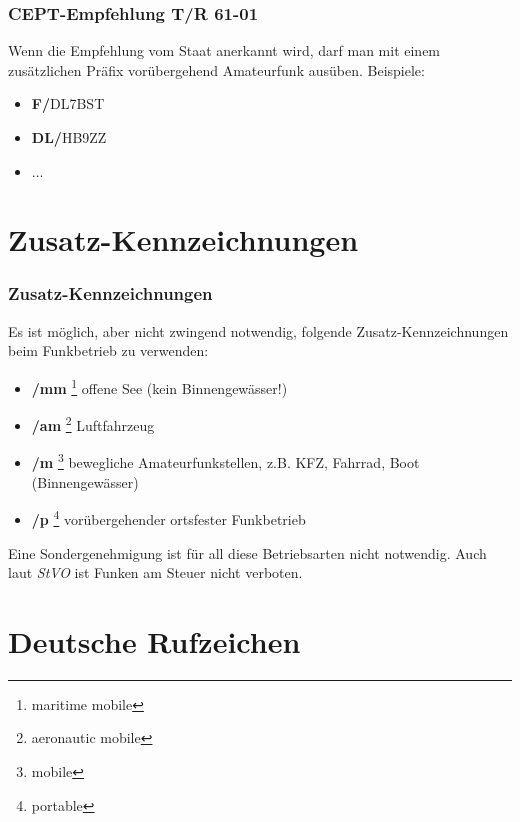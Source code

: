 \begin{frame}
    \frametitle{CEPT-Empfehlung T/R 61-01}

    Wenn die Empfehlung vom Staat anerkannt wird, darf man mit einem
    zusätzlichen Präfix vorübergehend Amateurfunk ausüben. Beispiele:

    \begin{itemize}
        \item \textbf{F/}DL7BST
        \item \textbf{DL/}HB9ZZ
        \item ...
    \end{itemize}

\end{frame}

\section{Zusatz-Kennzeichnungen}

\begin{frame}
    \frametitle{Zusatz-Kennzeichnungen}

    Es ist möglich, aber nicht zwingend notwendig, folgende
    Zusatz-Kennzeichnungen beim Funkbetrieb zu verwenden:

    \begin{itemize}
        \item \textbf{/mm} \footnote{maritime mobile} offene See (kein Binnengewässer!)
        \item \textbf{/am} \footnote{aeronautic mobile} Luftfahrzeug
        \item \textbf{/m}  \footnote{mobile} bewegliche Amateurfunkstellen, z.B. KFZ, Fahrrad, Boot (Binnengewässer)
        \item \textbf{/p}  \footnote{portable} vorübergehender ortsfester Funkbetrieb
    \end{itemize}

    Eine Sondergenehmigung ist für all diese Betriebsarten nicht notwendig. Auch
    laut \emph{StVO} ist Funken am Steuer nicht verboten.

\end{frame}

\section{Deutsche Rufzeichen}

